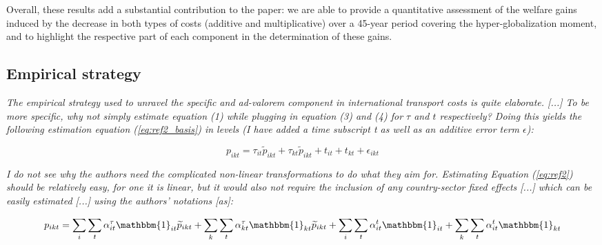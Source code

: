 \documentclass[a4paper,11pt]{article}
\begin{document}
Overall, these results add a substantial contribution to the paper: we are able to provide a quantitative assessment of the welfare gains induced by the decrease in both types of costs (additive and multiplicative) over a 45-year period covering the hyper-globalization moment, and to highlight the respective part of each component in the determination of these gains.






\subsection{Empirical strategy}

\textit{The empirical strategy used to unravel the specific and ad-valorem component in international
transport costs is quite elaborate. [...] To be more specific, why not simply estimate equation (1) while plugging
in equation (3) and (4) for $\tau$ and $t$ respectively? Doing this yields the following estimation equation (\ref{eq:ref2_basis}) in
levels (I have added a time subscript t as well as an additive error term $\epsilon$):}

\begin{equation}
p_{ikt}=\tau_{it}\widetilde{p}_{ikt}+ \tau_{kt}\widetilde{p}_{ikt} + t_{it} + t_{kt} + \epsilon_{ikt}   \label{eq:ref2_basis}
\end{equation}

\textit{I do not see why the authors need the complicated non-linear transformations to do what they aim
for. Estimating Equation (\ref{eq:ref2}) should be relatively easy, for one it is linear, but it would also not require the
inclusion of any country-sector fixed effects [...] which can be easily estimated [...] using the authors' notations [as]:}

\begin{equation}
p_{ikt}= \sum_i \sum_t \alpha_{it}^\tau \mathbbm{1}_{it}\widetilde{p}_{ikt} +  \sum_k \sum_t \alpha_{kt}^\tau \mathbbm{1}_{kt}\widetilde{p}_{ikt} + \sum_i \sum_t \alpha_{it}^t \mathbbm{1}_{it} + \sum_k \sum_t \alpha_{it}^t\mathbbm{1}_{kt} \label{eq:ref2}
\end{equation}
\end{document}
